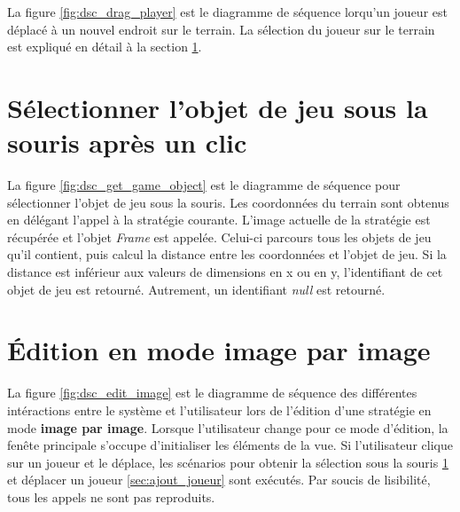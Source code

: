 
La figure \ref{fig:dsc_drag_player} est le diagramme de séquence lorqu'un joueur est déplacé à un nouvel endroit sur le terrain.
La sélection du joueur sur le terrain est expliqué en détail à la section \ref{sec:convertir_clic_en_objet}.

\section{Sélectionner l'objet de jeu sous la souris après un clic}
\label{sec:convertir_clic_en_objet}


La figure \ref{fig:dsc_get_game_object} est le diagramme de séquence pour sélectionner l'objet de jeu sous la souris.
Les coordonnées du terrain sont obtenus en délégant l'appel à la stratégie courante.
L'image actuelle de la stratégie est récupérée et l'objet \textit{Frame} est appelée.
Celui-ci parcours tous les objets de jeu qu'il contient, puis calcul la distance entre les coordonnées et l'objet de jeu.
Si la distance est inférieur aux valeurs de dimensions en x ou en y, l'identifiant de cet objet de jeu est retourné.
Autrement, un identifiant \textit{null} est retourné.

\section{Édition en mode image par image}
\label{sec:edition_image_par_image}


La figure \ref{fig:dsc_edit_image} est le diagramme de séquence des différentes intéractions entre le système et l'utilisateur lors de l'édition d'une stratégie en mode \textbf{image par image}.
Lorsque l'utilisateur change pour ce mode d'édition, la fenête principale s'occupe d'initialiser les éléments de la vue.
Si l'utilisateur clique sur un joueur et le déplace, les scénarios pour obtenir la sélection sous la souris \ref{sec:convertir_clic_en_objet} et déplacer un joueur \ref{sec:ajout_joueur} sont exécutés.
Par soucis de lisibilité, tous les appels ne sont pas reproduits.

